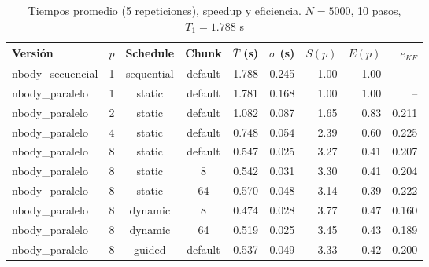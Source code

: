 \begin{table}[h!]
\centering
\caption{Tiempos promedio (5 repeticiones), speedup y eficiencia. $N=5000$, 10 pasos, $T_1 = 1.788$ s}
\label{tab:experimentos}
\small
\begin{tabular}{@{}lcccrrrrr@{}}
\toprule
\textbf{Versión} & \textbf{$p$} & \textbf{Schedule} & \textbf{Chunk} & \textbf{$\bar{T}$ (s)} & \textbf{$\sigma$ (s)} & \textbf{$S(p)$} & \textbf{$E(p)$} & \textbf{$e_{KF}$} \\ \midrule
nbody\_secuencial & 1 & sequential & default & 1.788 & 0.245 & 1.00 & 1.00 & -- \\
nbody\_paralelo & 1 & static & default & 1.781 & 0.168 & 1.00 & 1.00 & -- \\
nbody\_paralelo & 2 & static & default & 1.082 & 0.087 & 1.65 & 0.83 & 0.211 \\
nbody\_paralelo & 4 & static & default & 0.748 & 0.054 & 2.39 & 0.60 & 0.225 \\
nbody\_paralelo & 8 & static & default & 0.547 & 0.025 & 3.27 & 0.41 & 0.207 \\
nbody\_paralelo & 8 & static & 8 & 0.542 & 0.031 & 3.30 & 0.41 & 0.204 \\
nbody\_paralelo & 8 & static & 64 & 0.570 & 0.048 & 3.14 & 0.39 & 0.222 \\
nbody\_paralelo & 8 & dynamic & 8 & 0.474 & 0.028 & 3.77 & 0.47 & 0.160 \\
nbody\_paralelo & 8 & dynamic & 64 & 0.519 & 0.025 & 3.45 & 0.43 & 0.189 \\
nbody\_paralelo & 8 & guided & default & 0.537 & 0.049 & 3.33 & 0.42 & 0.200 \\
\bottomrule
\end{tabular}
\end{table}
